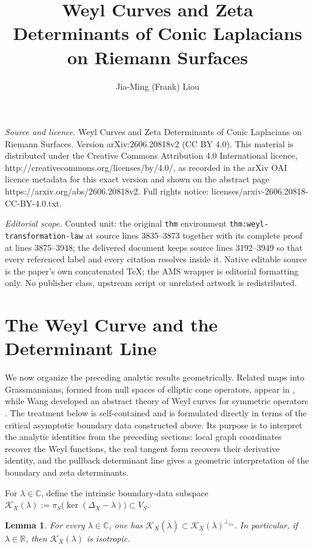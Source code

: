\documentclass[10pt,a4paper]{amsart}
\newtheorem{lem}[thm]{Lemma}
\numberwithin{equation}{section} \numberwithin{figure}{section}
\newcommand{\mb}[1]{\mathbb{#1}} %
\newcommand{\mc}[1]{\mathcal{#1}}
\begin{document}
\title[Weyl Curves and Zeta Determinants of Conic Laplacians on Rie]{Weyl Curves and Zeta Determinants of Conic Laplacians on Riemann Surfaces}
\author{Jia-Ming (Frank) Liou}
\date{}
\maketitle
\noindent\emph{Source and licence.} Weyl Curves and Zeta Determinants of Conic Laplacians on Riemann Surfaces. Version arXiv:2606.20818v2 (CC BY 4.0). This material is distributed under the Creative Commons Attribution 4.0 International licence, http://creativecommons.org/licenses/by/4.0/, as recorded in the arXiv OAI licence metadata for this exact version and shown on the abstract page https://arxiv.org/abs/2606.20818v2. Full rights notice: licenses/arxiv-2606.20818-CC-BY-4.0.txt.\par\smallskip
\noindent\textit{Editorial scope.} Counted unit: the original \texttt{thm} environment \texttt{thm:weyl-transformation-law} at source lines 3835--3873 together with its complete proof at lines 3875--3948; the delivered document keeps source lines 3192--3949 so that every referenced label and every citation resolves inside it. Native editable source is the paper's own concatenated TeX; the AMS wrapper is editorial formatting only. No publisher class, upstream script or unrelated artwork is redistributed.
\section{The Weyl Curve and the Determinant Line}
We now organize the preceding analytic results geometrically. Related
maps into Grassmannians, formed from null spaces of elliptic cone
operators, appear in \cite{GilKrainerMendoza2007}, while Wang developed an abstract
theory of Weyl curves for symmetric operators
\cite{WangWeylCurve}. The treatment below is self-contained and is
formulated directly in terms of the critical asymptotic boundary data
constructed above. Its purpose is to interpret the analytic identities
from the preceding sections: local graph coordinates recover the Weyl
functions, the real tangent form recovers their derivative identity,
and the pullback determinant line gives a geometric interpretation of
the boundary and zeta determinants.

For \(\lambda\in\mb C\), define the intrinsic boundary-data
subspace
\(\mc K_X(\lambda):=
\pi_S\bigl(\ker(\Delta_X-\lambda)\bigr)\subset V_S\).

\begin{lem}\label{lem:cauchy-data-orthogonality}
For every \(\lambda\in\mb C\), one has
\(\mc K_X(\overline{\lambda})
\subset\mc K_X(\lambda)^{\perp_{\omega_S}}\).
In particular, if \(\lambda\in\mb R\), then
\(\mc K_X(\lambda)\) is isotropic.
\end{lem}
\end{document}
